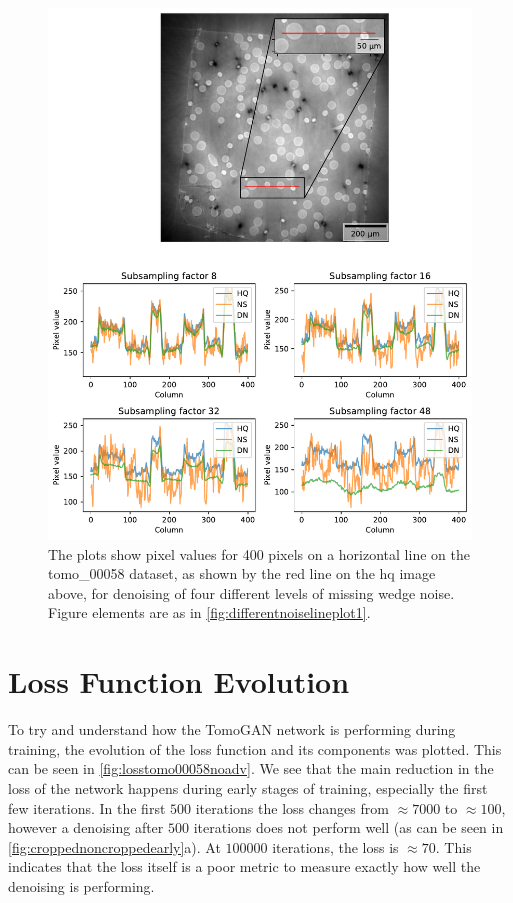 \begin{figure}[htbp]
  \centering
  \includegraphics[width=.95\textwidth]{figures/differentnoiselineplot2.pdf}
  \caption[Pixel value plot of denoising of different levels of noise on tomo\_00058]{The plots show pixel values for 400 pixels on a horizontal line on the tomo\_00058 dataset, as shown by the red line on the \acrshort{hq} image above, for denoising of four different levels of missing wedge noise. Figure elements are as in \cref{fig:differentnoiselineplot1}. }
  \label{fig:differentnoiselineplot2}
\end{figure}

\section{Loss Function Evolution}
To try and understand how the TomoGAN network is performing during training, the evolution of the loss function and its components was plotted. This can be seen in \cref{fig:losstomo00058noadv}. We see that the main reduction in the loss of the network happens during early stages of training, especially the first few iterations. In the first $500$ iterations the loss changes from $\approx 7000$ to $\approx 100$, however a denoising after $500$ iterations does not perform well (as can be seen in \cref{fig:croppednoncroppedearly}a). At $100000$ iterations, the loss is $\approx 70$. This indicates that the loss itself is a poor metric to measure exactly how well the denoising is performing.

